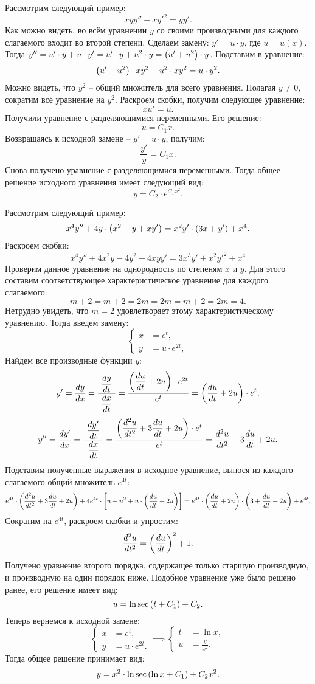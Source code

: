 		Рассмотрим следующий пример:
		\[ xyy'' - xy'^2 = yy'. \]
		Как можно видеть, во всём уравнении $y$ со своими производными для каждого слагаемого входит во второй степени. Сделаем замену: $y' = u \cdot y$, где $u = u(x)$. Тогда $y'' = u' \cdot y + u \cdot y' = u' \cdot y + u^2 \cdot y = \left( u' + u^2 \right) \cdot y$. Подставим в уравнение:
		\[ \left( u' + u^2 \right) \cdot x y^2 - u^2 \cdot x y^2 = u \cdot y^2. \]
		Можно видеть, что $y^2$ -- общий множитель для всего уравнения. Полагая $y \neq 0$, сократим всё уравнение на $y^2$. Раскроем скобки, получим следующее уравнение:
		\[ xu' = u. \]
		Получили уравнение с разделяющимися переменными. Его решение:
		\[ u = C_1 x. \]
		Возвращаясь к исходной замене -- $y' = u \cdot y$, получим:
		\[ \frac{y'}{y} = C_1 x. \]
		Снова получено уравнение с разделяющимися переменными. Тогда общее решение исходного уравнения имеет следующий вид:
		\[ y = C_2 \cdot e^{C_1 x^2}. \]

		Рассмотрим следующий пример:
		\[ x^4 y'' + 4y \cdot \left( x^2 - y + xy' \right) = x^2y' \cdot \left( 3x + y' \right) + x^4. \]
		Раскроем скобки:
		\[ x^4 y'' + 4x^2 y - 4y^2 + 4xyy' = 3x^3y' + x^2 y'^2 + x^4 \]
		Проверим данное уравнение на однородность по степеням $x$ и $y$. Для этого составим соответствующее характеристическое уравнение для каждого слагаемого:
		\[ m + 2 = m + 2 = 2m = 2m = m + 2 = 2m = 4. \]
		Нетрудно увидеть, что $m = 2$ удовлетворяет этому характеристическому уравнению. Тогда введем замену:
		\[ \left\lbrace \begin{split} 
			x &= e^{t}, \\
			y &= u \cdot e^{2t},
		\end{split} \right. \]
		Найдем все производные функции $y$:
		\[ y' = \dfrac{d y}{d x} = \frac{~\dfrac{d y}{d t}~}{~\dfrac{d x}{d t}~} = \frac{\left( \dfrac{d u}{d t} + 2u \right) \cdot e^{2t}}{e^{t}} = \left( \dfrac{d u}{d t} + 2u \right) \cdot e^{t}, \]
		\[ y'' = \dfrac{d y'}{d x} = \frac{~\dfrac{d y'}{d t}~}{~\dfrac{d x}{d t}~} = \frac{\left( \dfrac{d^{2} u}{d t^{2}} + 3\dfrac{d u}{d t} + 2u \right) \cdot e^{t}}{e^{t}} = \dfrac{d^{2} u}{d t^{2}} + 3\dfrac{d u}{d t} + 2u. \]
		Подставим полученные выражения в исходное уравнение, вынося из каждого слагаемого общий множитель $e^{4t}$:
		\[ e^{4t} \cdot \left( \dfrac{d^{2} u}{d t^{2}} + 3\dfrac{d u}{d t} + 2u \right) + 4e^{4t} \cdot \left[ u - u^2 + u \cdot \left( \dfrac{d u}{d t} + 2u \right) \right] = e^{4t} \cdot \left( \dfrac{d u}{d t} + 2u \right) \cdot \left( 3 + \dfrac{d u}{d t} + 2u \right) + e^{4t}. \]
		Сократим на $e^{4t}$, раскроем скобки и упростим:
		\[ \dfrac{d^{2} u}{d t^{2}} = \left( \dfrac{d u}{d t} \right)^2 + 1. \]
		Получено уравнение второго порядка, содержащее только старшую производную, и производную на один порядок ниже. Подобное уравнение уже было решено ранее, его решение имеет вид:
		\[ u = \ln{\sec \left( t + C_1 \right) } + C_2. \]
		Теперь вернемся к исходной замене:
		\[ \left\lbrace \begin{split} 
			x &= e^{t}, \\
			y &= u \cdot e^{2t}.
		\end{split} \right. \implies \left\lbrace \begin{split}
			t &= \ln{x}, \\
			u &= \frac{y}{x^2}.
		\end{split} \right. \]
		Тогда общее решение принимает вид:
		\[ y = x^2 \cdot \ln{\sec{ \left( \ln{x} + C_1 \right) }} + C_2 x^2. \]

	\pagebreak